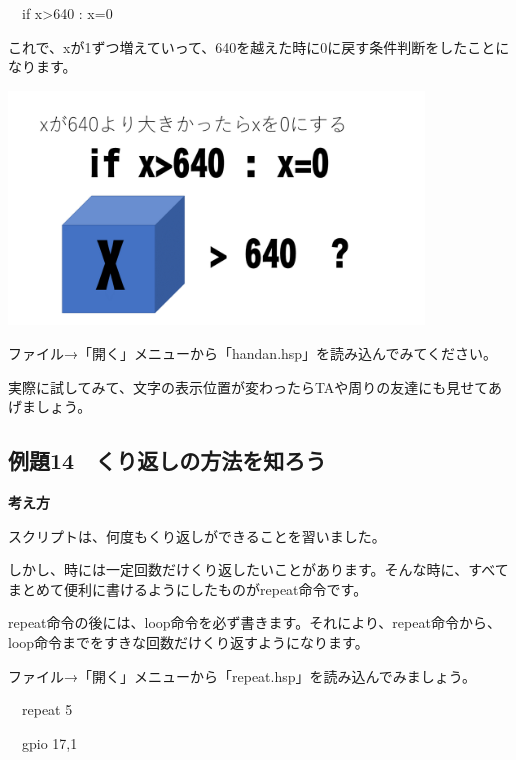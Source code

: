 \documentclass[a4paper,12pt]{jarticle}
\begin{document}
\bigskip

\ \ if x{\textgreater}640 : x=0

\bigskip

これで、xが1ずつ増えていって、640を越えた時に0に戻す条件判断をしたことになります。

\bigskip
\bigskip

\begin{minipage}{9.781cm}
\centering
{\upshape
\includegraphics[keepaspectratio,width=11.033cm,height=6.209cm]{text02-img/text02-img052.png}}
\end{minipage}

\bigskip
\bigskip
\bigskip

ファイル→「開く」メニューから「handan.hsp」を読み込んでみてください。

実際に試してみて、文字の表示位置が変わったらTAや周りの友達にも見せてあげましょう。


\clearpage
\subsection{例題14　くり返しの方法を知ろう}
\bigskip
\bigskip

{\bfseries
考え方}

\bigskip

スクリプトは、何度もくり返しができることを習いました。

しかし、時には一定回数だけくり返したいことがあります。そんな時に、すべてまとめて便利に書けるようにしたものがrepeat命令です。

repeat命令の後には、loop命令を必ず書きます。それにより、repeat命令から、loop命令までをすきな回数だけくり返すようになります。

ファイル→「開く」メニューから「repeat.hsp」を読み込んでみましょう。

\bigskip

\ \ repeat 5

\ \ gpio 17,1
\end{document}

